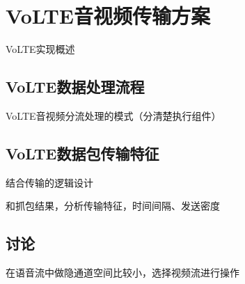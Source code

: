 \section{VoLTE音视频传输方案}
\label{chap:backinfo:volte}

VoLTE实现概述

\subsection{VoLTE数据处理流程}
\label{chap:backinfo:volte:datastream}

VoLTE音视频分流处理的模式（分清楚执行组件）

\subsection{VoLTE数据包传输特征}
\label{chap:backinfo:volte:packets}

结合传输的逻辑设计

和抓包结果，分析传输特征，时间间隔、发送密度

\subsection{讨论}
\label{chap:backinfo:volte:discuss}

在语音流中做隐通道空间比较小，选择视频流进行操作
